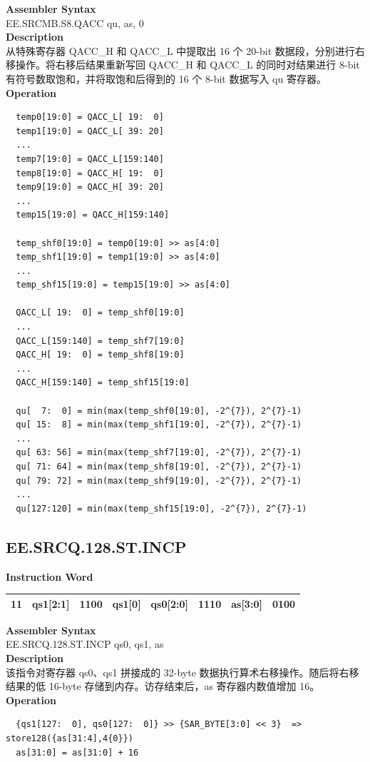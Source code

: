 \textbf{Assembler Syntax} \\
EE.SRCMB.S8.QACC qu, as, 0 \\
\textbf{Description} \\
从特殊寄存器 QACC\_H 和 QACC\_L 中提取出 16 个 20-bit 数据段，分别进行右移操作。将右移后结果重新写回 QACC\_H 和 QACC\_L 的同时对结果进行 8-bit 有符号数取饱和，并将取饱和后得到的 16 个 8-bit 数据写入 qu 寄存器。\\
\textbf{Operation}
\begin{lstlisting}
  temp0[19:0] = QACC_L[ 19:  0]
  temp1[19:0] = QACC_L[ 39: 20]
  ...
  temp7[19:0] = QACC_L[159:140]
  temp8[19:0] = QACC_H[ 19:  0]
  temp9[19:0] = QACC_H[ 39: 20]
  ...
  temp15[19:0] = QACC_H[159:140]

  temp_shf0[19:0] = temp0[19:0] >> as[4:0]
  temp_shf1[19:0] = temp1[19:0] >> as[4:0]
  ...
  temp_shf15[19:0] = temp15[19:0] >> as[4:0]

  QACC_L[ 19:  0] = temp_shf0[19:0]
  ...
  QACC_L[159:140] = temp_shf7[19:0]
  QACC_H[ 19:  0] = temp_shf8[19:0]
  ...
  QACC_H[159:140] = temp_shf15[19:0]

  qu[  7:  0] = min(max(temp_shf0[19:0], -2^{7}), 2^{7}-1)
  qu[ 15:  8] = min(max(temp_shf1[19:0], -2^{7}), 2^{7}-1)
  ...
  qu[ 63: 56] = min(max(temp_shf7[19:0], -2^{7}), 2^{7}-1)
  qu[ 71: 64] = min(max(temp_shf8[19:0], -2^{7}), 2^{7}-1)
  qu[ 79: 72] = min(max(temp_shf9[19:0], -2^{7}), 2^{7}-1)
  ...
  qu[127:120] = min(max(temp_shf15[19:0], -2^{7}), 2^{7}-1)
\end{lstlisting}

\clearpage
\subsection{EE.SRCQ.128.ST.INCP}\label{instruction:EESRCQ128STINCP}
\setlength\tabcolsep{6pt}
\textbf{Instruction Word} \\
\begin{tabular}{|c|c|c|c|c|c|c|c|}
	\hline
	11 & qs1[2:1] & 1100 & qs1[0] & qs0[2:0] & 1110 & as[3:0] & 0100 \\
	\hline
\end{tabular}

\textbf{Assembler Syntax} \\
EE.SRCQ.128.ST.INCP qs0, qs1, as \\
\textbf{Description} \\
该指令对寄存器 qs0、qs1 拼接成的 32-byte 数据执行算术右移操作。随后将右移结果的低 16-byte 存储到内存。访存结束后，as 寄存器内数值增加 16。\\
\textbf{Operation}
\begin{lstlisting}
  {qs1[127:  0], qs0[127:  0]} >> {SAR_BYTE[3:0] << 3}  => store128({as[31:4],4{0}})
  as[31:0] = as[31:0] + 16
\end{lstlisting}


